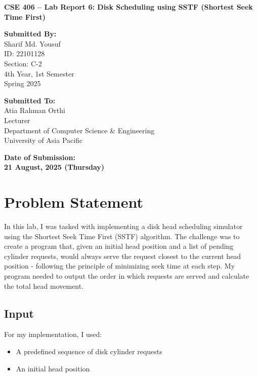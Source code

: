 \documentclass[12pt,a4paper]{article}
\begin{document}
\begin{titlepage}
  \centering
  \vspace*{3cm}

  {\Huge\bfseries CSE 406 – Lab Report 6: Disk Scheduling using SSTF (Shortest Seek Time First) \par}
  \vspace{2.5cm}

  \noindent
  \begin{minipage}[t]{0.48\textwidth}
    {\large\bfseries Submitted By:}\\[0.5em]
    \Large
    Sharif Md. Yousuf \\
    ID: 22101128 \\
    Section: C-2 \\
    4th Year, 1st Semester \\
    Spring 2025
  \end{minipage}
  \hfill
  \begin{minipage}[t]{0.48\textwidth}
    {\large\bfseries Submitted To:}\\[0.5em]
    \Large
    Atia Rahman Orthi \\
    Lecturer \\
    Department of Computer Science \& Engineering \\
    University of Asia Pacific
  \end{minipage}

  \vfill

  {\Large\bfseries Date of Submission:} \\[0.5em]
  {\LARGE\bfseries 21 August, 2025 (Thursday)}

  \vspace*{2cm}
\end{titlepage}

\section{Problem Statement}
In this lab, I was tasked with implementing a disk head scheduling simulator using the Shortest Seek Time First (SSTF) algorithm. The challenge was to create a program that, given an initial head position and a list of pending cylinder requests, would always serve the request closest to the current head position - following the principle of minimizing seek time at each step. My program needed to output the order in which requests are served and calculate the total head movement.

\subsection*{Input}
For my implementation, I used:
\begin{itemize}
  \item A predefined sequence of disk cylinder requests
  \item An initial head position
\end{itemize}
\end{document}
